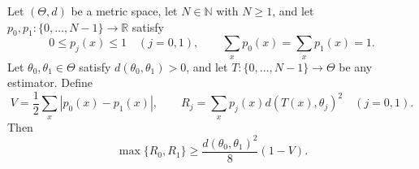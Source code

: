 \begin{theorem}
Let $(\Theta,d)$ be a metric space, let $N\in\mathbb N$ with $N\ge1$, and
let $p_0,p_1:\{0,\ldots,N-1\}\to\mathbb R$ satisfy
\[
  0\le p_j(x)\le1\quad(j=0,1),\qquad
  \sum_xp_0(x)=\sum_xp_1(x)=1.
\]
Let $\theta_0,\theta_1\in\Theta$ satisfy
$d(\theta_0,\theta_1)>0$, and let
$T:\{0,\ldots,N-1\}\to\Theta$ be any estimator.  Define
\[
  V=\frac12\sum_x|p_0(x)-p_1(x)|,
  \qquad
  R_j=\sum_xp_j(x)d(T(x),\theta_j)^2\quad(j=0,1).
\]
Then
\[
  \max\{R_0,R_1\}\ge
  \frac{d(\theta_0,\theta_1)^2}{8}(1-V).
\]
\end{theorem}
